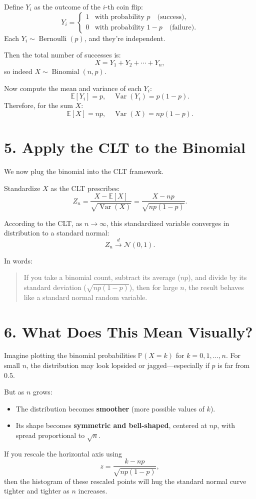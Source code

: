 \documentclass[12pt]{article}
\begin{document}
Define $Y_i$ as the outcome of the $i$-th coin flip:
\[
Y_i = 
\begin{cases}
1 & \text{with probability } p \quad \text{(success)}, \\
0 & \text{with probability } 1 - p \quad \text{(failure)}.
\end{cases}
\]
Each $Y_i \sim \operatorname{Bernoulli}(p)$, and they’re independent.

Then the total number of successes is:
\[
X = Y_1 + Y_2 + \cdots + Y_n,
\]
so indeed $X \sim \operatorname{Binomial}(n, p)$.

Now compute the mean and variance of each $Y_i$:
\[
\mathbb{E}[Y_i] = p, \quad \operatorname{Var}(Y_i) = p(1 - p).
\]
Therefore, for the sum $X$:
\[
\mathbb{E}[X] = np, \quad \operatorname{Var}(X) = np(1 - p).
\]

\section*{5. Apply the CLT to the Binomial}

We now plug the binomial into the CLT framework.

Standardize $X$ as the CLT prescribes:
\[
Z_n = \frac{X - \mathbb{E}[X]}{\sqrt{\operatorname{Var}(X)}} = \frac{X - np}{\sqrt{np(1 - p)}}.
\]

According to the CLT, as $n \to \infty$, this standardized variable converges in distribution to a standard normal:
\[
Z_n \xrightarrow{d} \mathcal{N}(0, 1).
\]

In words:
\begin{quote}
    If you take a binomial count, subtract its average ($np$), and divide by its standard deviation ($\sqrt{np(1-p)}$), then for large $n$, the result behaves like a standard normal random variable.
\end{quote}

\section*{6. What Does This Mean Visually?}

Imagine plotting the binomial probabilities $\mathbb{P}(X = k)$ for $k = 0, 1, \dots, n$. For small $n$, the distribution may look lopsided or jagged—especially if $p$ is far from $0.5$.

But as $n$ grows:
\begin{itemize}\item The distribution becomes \textbf{smoother} (more possible values of $k$).
    \item Its shape becomes \textbf{symmetric and bell-shaped}, centered at $np$, with spread proportional to $\sqrt{n}$.
\end{itemize}
If you rescale the horizontal axis using
\[
z = \frac{k - np}{\sqrt{np(1 - p)}},
\]
then the histogram of these rescaled points will hug the standard normal curve tighter and tighter as $n$ increases.
\end{document}
